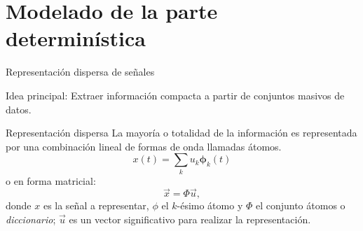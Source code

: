 \documentclass[xcolor=table]{beamer}
\begin{document}
\section{Modelado de la parte determin\'istica}
\begin{frame}{Representaci\'on dispersa de se\~nales}

\alert{Idea principal:} Extraer informaci\'on compacta a partir de conjuntos masivos de datos.
		\begin{exampleblock}{Representaci\'on dispersa}
			La mayor\'ia o totalidad de la informaci\'on es representada por una
			combinaci\'on lineal de formas de onda llamadas \'atomos.
			$$x(t)=\sum_{k}u_{k}\mathbf{\phi}_{k}(t)$$
			o en forma matricial:
			$$\vec{x}=\Phi \vec{u},$$
			donde $x$ es la se\~nal a representar, $\phi$ el $k$-\'esimo \'atomo y $\Phi$ el conjunto \'atomos o 							\emph{diccionario}; $\vec{u}$ es un vector significativo para realizar la representaci\'on.
		\end{exampleblock}
\end{frame}
	
\end{document}
